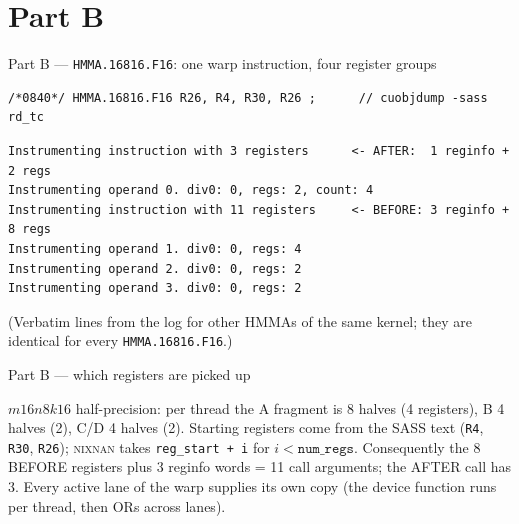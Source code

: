 \documentclass[aspectratio=169,10pt]{beamer}
\newcommand{\nn}{\textsc{nixnan}}
\begin{document}
\section{Part B}
\begin{frame}[fragile]{Part B --- \texttt{HMMA.16816.F16}: one warp instruction, four register groups}
\begin{lstlisting}
/*0840*/ HMMA.16816.F16 R26, R4, R30, R26 ;      // cuobjdump -sass rd_tc
\end{lstlisting}
\begin{lstlisting}
Instrumenting instruction with 3 registers      <- AFTER:  1 reginfo + 2 regs
Instrumenting operand 0. div0: 0, regs: 2, count: 4
Instrumenting instruction with 11 registers     <- BEFORE: 3 reginfo + 8 regs
Instrumenting operand 1. div0: 0, regs: 4
Instrumenting operand 2. div0: 0, regs: 2
Instrumenting operand 3. div0: 0, regs: 2
\end{lstlisting}
\small (Verbatim lines from the log for other HMMAs of the same kernel; they are identical for every \texttt{HMMA.16816.F16}.)
\end{frame}

\begin{frame}{Part B --- which registers are picked up}
\centering
{}

\small\raggedright
$m16n8k16$ half-precision: per thread the A fragment is 8 halves (4 registers), B 4 halves (2), C/D 4 halves (2). Starting registers come from the SASS text (\texttt{R4}, \texttt{R30}, \texttt{R26}); \nn{} takes \texttt{reg\_start + i} for $i<\texttt{num\_regs}$. Consequently the 8 BEFORE registers plus 3 reginfo words = 11 call arguments; the AFTER call has 3.
Every active lane of the warp supplies its own copy (the device function runs per thread, then ORs across lanes).
\end{frame}
\end{document}

